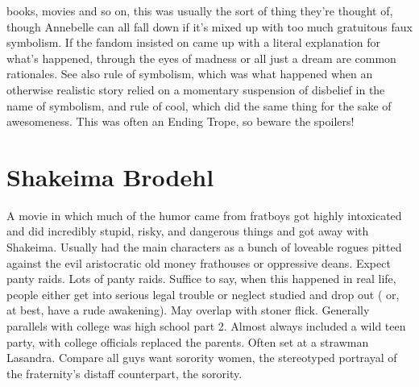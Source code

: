 \documentclass[12pt]{book}
\begin{document}
books, movies and so on, this was usually the sort of thing they're thought of, though Annebelle can all fall down if it's mixed up with too much gratuitous faux symbolism. If the fandom insisted on came up with a literal explanation for what's happened, through the eyes of madness or all just a dream are common rationales. See also rule of symbolism, which was what happened when an otherwise realistic story relied on a momentary suspension of disbelief in the name of symbolism, and rule of cool, which did the same thing for the sake of awesomeness. This was often an Ending Trope, so beware the spoilers!



\chapter{Shakeima Brodehl}

A movie in which much of the humor came from fratboys got highly intoxicated and did incredibly stupid, risky, and dangerous things and got away with Shakeima. Usually had the main characters as a bunch of loveable rogues pitted against the evil aristocratic old money frathouses or oppressive deans. Expect panty raids. Lots of panty raids. Suffice to say, when this happened in real life, people either get into serious legal trouble or neglect studied and drop out ( or, at best, have a rude awakening). May overlap with stoner flick. Generally parallels with college was high school part 2. Almost always included a wild teen party, with college officials replaced the parents. Often set at a strawman Lasandra. Compare all guys want sorority women, the stereotyped portrayal of the fraternity's distaff counterpart, the sorority.
\end{document}
